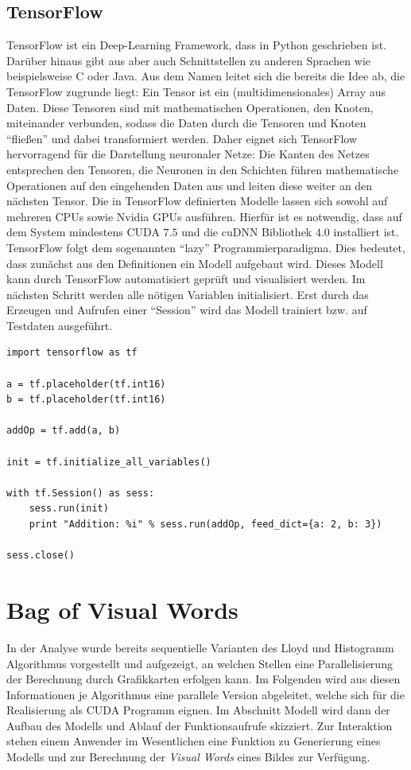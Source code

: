 \subsection{TensorFlow}

TensorFlow ist ein Deep-Learning Framework, dass in Python geschrieben ist. Darüber hinaus gibt aus aber auch Schnittstellen zu anderen Sprachen wie beispielsweise C oder Java. Aus dem Namen leitet sich die bereits die Idee ab, die TensorFlow zugrunde liegt: Ein Tensor ist ein (multidimensionales) Array aus Daten. Diese Tensoren sind mit mathematischen Operationen, den Knoten, miteinander verbunden, sodass die Daten durch die Tensoren und Knoten \enquote{fließen} und dabei transformiert werden. Daher eignet sich TensorFlow hervorragend für die Darstellung neuronaler Netze: Die Kanten des Netzes entsprechen den Tensoren, die Neuronen in den Schichten führen mathematische Operationen auf den eingehenden Daten aus und leiten diese weiter an den nächsten Tensor. Die in TensorFlow definierten Modelle lassen sich sowohl auf mehreren CPUs sowie Nvidia GPUs ausführen. Hierfür ist es notwendig, dass auf dem System mindestens CUDA $7.5$ und die cuDNN Bibliothek $4.0$ installiert ist. 
TensorFlow folgt dem sogenannten \enquote{lazy} Programmierparadigma. Dies bedeutet, dass zunächst aus den Definitionen ein Modell aufgebaut wird. Dieses Modell kann durch TensorFlow automatisiert geprüft und visualisiert werden. Im nächsten Schritt werden alle nötigen Variablen initialisiert. Erst durch das Erzeugen und Aufrufen einer \enquote{Session} wird das Modell trainiert bzw. auf Testdaten ausgeführt.

\lstset{language=Python}
\begin{lstlisting}
import tensorflow as tf

a = tf.placeholder(tf.int16)
b = tf.placeholder(tf.int16)

addOp = tf.add(a, b)

init = tf.initialize_all_variables()

with tf.Session() as sess:
    sess.run(init)
    print "Addition: %i" % sess.run(addOp, feed_dict={a: 2, b: 3})

sess.close()
\end{lstlisting}

\section{Bag of Visual Words}

In der Analyse wurde bereits sequentielle Varianten des Lloyd und Histogramm Algorithmus vorgestellt und aufgezeigt, an welchen Stellen eine Parallelisierung der Berechnung durch Grafikkarten erfolgen kann. Im Folgenden wird aus diesen Informationen je Algorithmus eine parallele Version abgeleitet, welche sich für die Realisierung als CUDA Programm eignen.
Im Abschnitt Modell wird dann der Aufbau des Modells und Ablauf der Funktionsaufrufe skizziert. Zur Interaktion stehen einem Anwender im Wesentlichen eine Funktion zu Generierung eines Modells und zur Berechnung der \textit{Visual Words} eines Bildes zur Verfügung.

